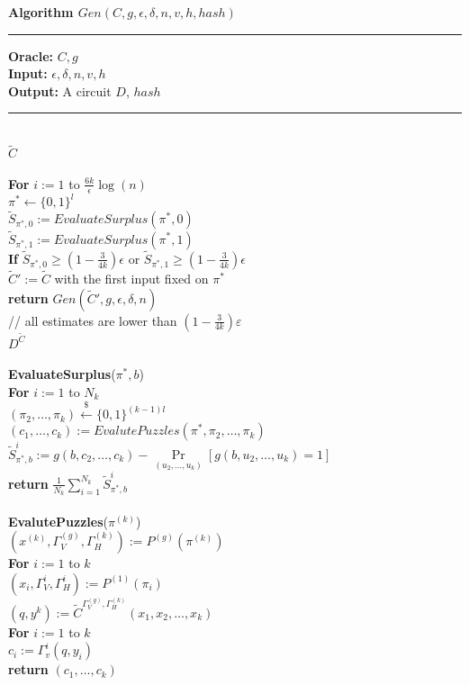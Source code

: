 \begin{codeblock}
  \textbf{Algorithm $Gen(C,g,\epsilon,\delta,n, v, h, hash)$}
  \medskip

  \hrule

  \medskip

  \textbf{Oracle:} $C, g$ \\
  \textbf{Input:}  $\epsilon, \delta, n, v, h$\\
  \textbf{Output:} A circuit $D$, $hash$
  \medskip\hrule\medskip
  \If {} \then \\
  \IndI \return $\widetilde{C}$ \\ \\
  \textbf{For} $i:=1$ to $\frac{6k}{\epsilon}\log(n)$ \\
  \IndI $\pi^* \leftarrow \{0,1\}^{l}$\\
  \IndI $\widetilde{S}_{\pi^*,0} := EvaluateSurplus(\pi^*, 0)$\\
  \IndI $\widetilde{S}_{\pi^*,1} := EvaluateSurplus(\pi^*, 1)$\\
  \IndI \textbf{If} $\widetilde{S}_{\pi^*,0} \geq (1 - \frac{3}{4k}) \epsilon$ or $\widetilde{S}_{\pi^*,1} \geq (1 - \frac{3}{4k}) \epsilon$ \\
  \IndII $\widetilde{C}' := \widetilde{C}$ with the first input fixed on $\pi^*$\\
  \IndII\textbf{return} $Gen(\widetilde{C}', g, \epsilon, \delta, n)$ \\
  // all estimates are lower than $(1-\frac{3}{4k})\varepsilon$\\
  \return $D^{\widetilde{C}}$ \\
  \\
  \textbf{EvaluateSurplus}($\pi^*, b$) \\
  \IndI \textbf{For} $i:=1$ to $N_k$ \\
  \IndII $(\pi_2, \dots, \pi_k) \xleftarrow{\$} \{0,1\}^{(k-1)l}$\\
  \IndII $(c_1, \dots, c_k) := EvalutePuzzles(\pi^*, \pi_2, \dots, \pi_k)$\\
  \IndII $\widetilde{S}_{\pi^*,b}^i := g(b, c_2, \dots, c_k) - \underset{(u_2, \dots, u_k)}{\Pr}[g(b, u_2, \dots, u_k) = 1] $\\
  \IndI \textbf{return} $\frac{1}{N_k} \sum_{i=1}^{N_k} \widetilde{S}_{\pi^*,b}^i$\\
  \\
  \textbf{EvalutePuzzles}($\pi^{(k)}$)\\
  \IndI $(x^{(k)}, \Gamma_V^{(g)}, \Gamma_H^{(k)}) := P^{(g)}(\pi^{(k)})$ \\
  \IndI \textbf{For} $i:=1$ to $k$\\
  \IndII $(x_i, \Gamma_V^{i}, \Gamma_H^{i}) := P^{(1)}(\pi_i)$\\
  \IndI $(q,y^{k}) := \widetilde{C}^{\Gamma_V^{(g)}, \Gamma_H^{(k)}}(x_1, x_2, \dots, x_k)$\\
  \IndI \textbf{For} $i:=1$ to $k$\\
  \IndII $c_i := \Gamma_v^{i}(q, y_i)$\\
  \IndI \textbf{return} $(c_1, \dots, c_k)$\\
\end{codeblock}
